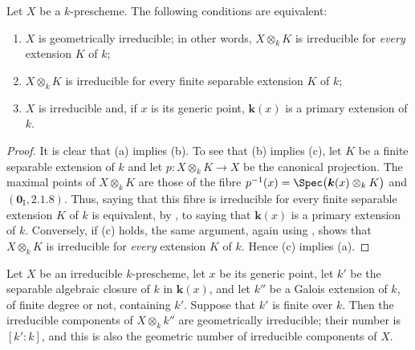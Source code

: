 \begin{proposition}[4.5.9]
\label{IV.4.5.9}
Let $X$ be a $k$-prescheme.  The following conditions are equivalent:
\begin{enumerate}
\item[\rm(a)]
\label{IV.4.5.9.a}
$X$ is geometrically irreducible; in other words,
$X\otimes_k K$ is irreducible for \emph{every} extension $K$ of $k$;

\item[\rm(b)]
\label{IV.4.5.9.b}
$X\otimes_k K$ is irreducible for every finite separable extension
$K$ of $k$;

\item[\rm(c)]
\label{IV.4.5.9.c}
$X$ is irreducible and, if $x$ is its generic point,
$\boldsymbol{k}(x)$ is a primary extension of $k$.
\end{enumerate}
\end{proposition}

\begin{proof}
It is clear that (a) implies (b).
To see that (b) implies (c), let $K$ be a finite separable extension
of $k$ and let $p:X\otimes_k K\longrightarrow X$
be the canonical projection.
The maximal points of $X\otimes_k K$ are those of the fibre $p^{-1}(x)=\Spec\bigl(\boldsymbol{k}(x)\otimes_k K\bigr)$
 and $(\mathbf{0}_{\mathrm I},2.1.8)$.
Thus, saying that this fibre is irreducible for every finite separable
extension $K$ of $k$ is equivalent, by , to saying that
$\boldsymbol{k}(x)$ is a primary extension of $k$.
Conversely, if (c) holds, the same argument, again using
, shows that $X\otimes_k K$ is irreducible for \emph{every}
extension $K$ of $k$.
Hence (c) implies (a).
\end{proof}


\begin{corollary}[4.5.10]
\label{IV.4.5.10}
Let $X$ be an irreducible $k$-prescheme, let $x$ be its generic point,
let $k'$ be the separable algebraic closure of $k$ in $\boldsymbol{k}(x)$,
and let $k''$ be a Galois extension of $k$, of finite degree or not,
containing $k'$.
Suppose that $k'$ is finite over $k$.
Then the irreducible components of $X\otimes_k k''$ are geometrically
irreducible; their number is $[k':k]$, and this is also the geometric
number of irreducible components of $X$.
\end{corollary}

